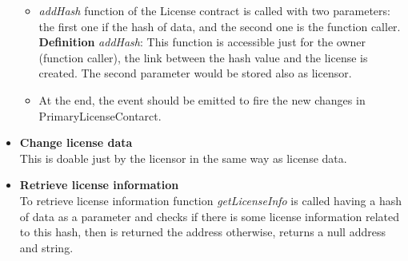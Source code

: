 \begin{itemize}
\begin{itemize}
		\item \textit{addHash} function of the License contract is called with two parameters: the first one if the hash of data, and the second one is the function caller.\\
		\hspace{1cm} \textbf{Definition} \textit{addHash}: This function is accessible just for the owner (function caller), the link between the hash value and the license is created. The second parameter would be stored also as licensor. \\
		\item At the end, the event should be emitted to fire the new changes in PrimaryLicenseContarct.
		
	\end{itemize}
	\item \textbf{Change license data} \\
	This is doable just by the licensor in the same way as license data.  \\
	\item \textbf{Retrieve license information} \\
	To retrieve license information function \textit{getLicenseInfo} is called having a hash of data as a parameter and checks if there is some license information related to this hash, then is returned the address otherwise, returns a null address and string.
	
\end{itemize}
